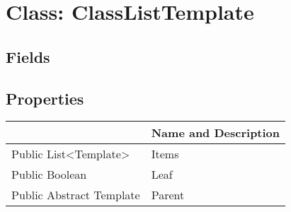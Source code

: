 \documentclass[11pt, oneside, a4paper]{book}
\begin{document}
\hypertarget{SoftwareEngineeringTools.{}Documentation.{}ClassListTemplate}{}
\section{Class: ClassListTemplate}

\subsection{Fields}

\subsection{Properties}
\begin{center}
\begin{tabular}{| p{3cm} | p{12cm} | }
\hline
\textbf{ } & \textbf{ Name and Description}\\
\hline
 Public  List<Template> &  Items\hypertarget{SoftwareEngineeringTools.{}Documentation.{}ClassListTemplate.{}Items}{}\\
\hline
 Public  Boolean &  Leaf\hypertarget{SoftwareEngineeringTools.{}Documentation.{}ClassListTemplate.{}Leaf}{}\\
\hline
 Public  Abstract  Template &  Parent\hypertarget{SoftwareEngineeringTools.{}Documentation.{}ClassListTemplate.{}Parent}{}\\
\hline
\end{tabular}
\end{center}
\end{document}
